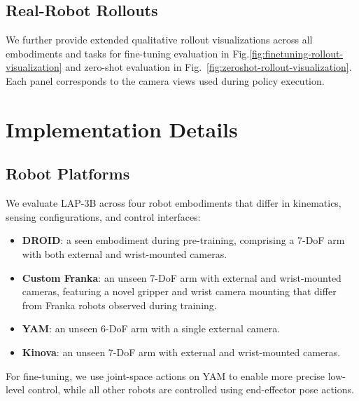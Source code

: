 \subsection{Real-Robot Rollouts}
We further provide extended qualitative rollout visualizations across all embodiments and tasks for fine-tuning evaluation in Fig.\ref{fig:finetuning-rollout-visualization} and zero-shot evaluation in Fig.~\ref{fig:zeroshot-rollout-visualization}. 
Each panel corresponds to the camera views used during policy execution. 


\section{Implementation Details}
\label{app:implementation_details}

\subsection{Robot Platforms} 
We evaluate \textsc{LAP-3B} across four robot embodiments that differ in kinematics, sensing configurations, and control interfaces:
\begin{itemize}
\item \textbf{DROID}: a seen embodiment during pre-training, comprising a 7-DoF arm with both external and wrist-mounted cameras.
\item \textbf{Custom Franka}: an unseen 7-DoF arm with external and wrist-mounted cameras, featuring a novel gripper and wrist camera mounting that differ from Franka robots observed during training.
\item \textbf{YAM}: an unseen 6-DoF arm with a single external camera.
\item \textbf{Kinova}: an unseen 7-DoF arm with external and wrist-mounted cameras.
\end{itemize}

For fine-tuning, we use joint-space actions on YAM to enable more precise low-level control, while all other robots are controlled using end-effector pose actions.




